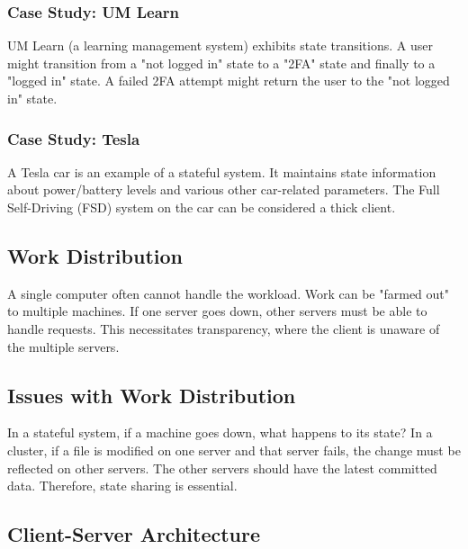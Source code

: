 \subsubsection{Case Study: UM Learn}

UM Learn (a learning management system) exhibits state transitions. A user might transition from a "not logged in" state to a "2FA" state and finally to a "logged in" state.  A failed 2FA attempt might return the user to the "not logged in" state.

\subsubsection{Case Study: Tesla}

A Tesla car is an example of a stateful system. It maintains state information about power/battery levels and various other car-related parameters. The Full Self-Driving (FSD) system on the car can be considered a thick client.

\subsection{Work Distribution}

A single computer often cannot handle the workload. Work can be "farmed out" to multiple machines.  If one server goes down, other servers must be able to handle requests.  This necessitates transparency, where the client is unaware of the multiple servers.

\subsection{Issues with Work Distribution}

In a stateful system, if a machine goes down, what happens to its state? In a cluster, if a file is modified on one server and that server fails, the change must be reflected on other servers. The other servers should have the latest committed data.  Therefore, state sharing is essential.


\subsection{Client-Server Architecture}

